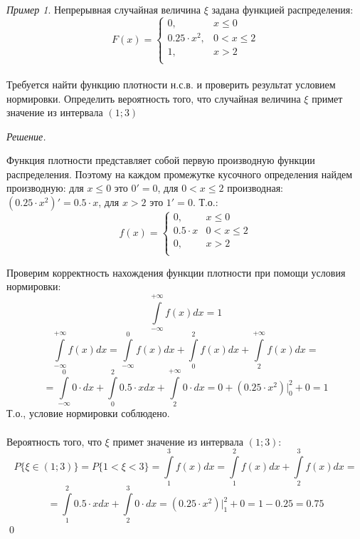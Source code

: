 \documentclass[12pt,a4paper]{article}
\theoremstyle{definition}
\theoremstyle{definition}
\theoremstyle{remark}
\theoremstyle{corollary}
\theoremstyle{bolditalic}
\newtheorem{example}{Пример}[section]
\newenvironment{solution}{
    \vspace{0.5em}
    \noindent\textit{Решение.}
}{\qed\vspace{1em}}
\begin{document}
\begin{example}
    Непрерывная случайная величина $\xi$ задана функцией распределения:\\

    \[
    F(x) = \begin{cases}
      0, & x \le 0 \\
      0.25\cdot x^2, & 0 < x \le 2 \\
      1, & x > 2 \\
    \end{cases}
    \]
    \\
    
    Требуется найти функцию плотности н.с.в. и проверить результат условием нормировки. Определить вероятность того, что случайная величина $\xi$ примет значение из интервала $(1;3)$
\end{example}
\begin{solution}
    Функция плотности представляет собой первую производную функции распределения. Поэтому на каждом промежутке кусочного определения найдем производную: для $x \le 0$ это $0' = 0$, для $0 < x \le 2$ производная: $(0.25\cdot x^2)'= 0.5\cdot x$, для $x > 2$ это $1' = 0$. Т.о.:\\
    \[
    f(x) = \begin{cases}
      0, & x \le 0 \\
      0.5\cdot x & 0 < x \le 2 \\
      0, & x > 2 \\
    \end{cases}
    \]

    Проверим корректность нахождения функции плотности при помощи условия нормировки:
    \[
    \int\limits_{-\infty}^{+\infty}{f(x)dx} = 1
    \]
    \[
    \int\limits_{-\infty}^{+\infty}{f(x)dx} = \int\limits_{-\infty}^{0}{f(x)dx} + \int\limits_{0}^{2}{f(x)dx} + \int\limits_{2}^{+\infty}{f(x)dx}=
    \]
    \[
    =\int\limits_{-\infty}^{0}{0\cdot dx} + \int\limits_{0}^{2}{0.5\cdot xdx} + \int\limits_{2}^{+\infty}{0\cdot dx}=0+\left(0.25\cdot x^2\right){\Big|}_{0}^{2}+0=1
    \]
    Т.о., условие нормировки соблюдено.\\
    \\
    Вероятность того, что $\xi$ примет значение из интервала $(1;3)$:
    \[
    P\{\xi\in(1;3)\}=P\{1<\xi<3\}=\int\limits_{1}^{3}{f(x)dx}=\int\limits_{1}^{2}{f(x)dx}+\int\limits_{2}^{3}{f(x)dx}=
    \]
    \[
    = \int\limits_{1}^{2}{0.5\cdot x dx} + \int\limits_{2}^{3}{0\cdot dx}=\left(0.25\cdot x^2\right){\Big|}_{1}^{2} + 0=1-0.25 = 0.75
    \]
\end{solution}
\end{document}
